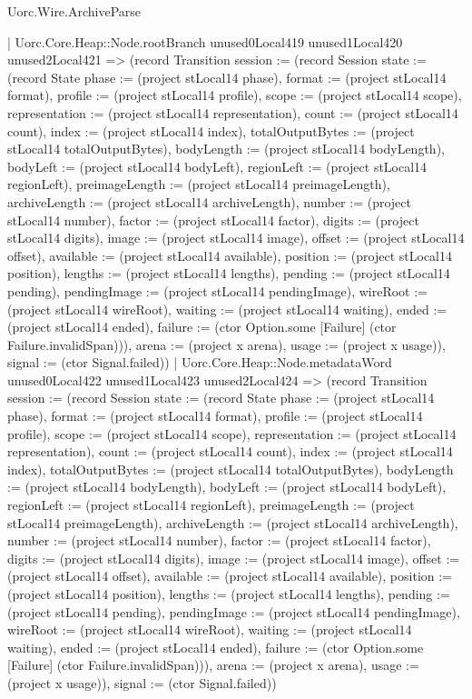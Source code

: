 \begin{lexlean}{Uorc.Wire.ArchiveParse}
\begin{semanticmodule}
{            | Uorc.Core.Heap::Node.rootBranch unused0Local419 unused1Local420 unused2Local421 => (record Transition {session := (record Session {state := (record State {phase := (project stLocal14 phase), format := (project stLocal14 format), profile := (project stLocal14 profile), scope := (project stLocal14 scope), representation := (project stLocal14 representation), count := (project stLocal14 count), index := (project stLocal14 index), totalOutputBytes := (project stLocal14 totalOutputBytes), bodyLength := (project stLocal14 bodyLength), bodyLeft := (project stLocal14 bodyLeft), regionLeft := (project stLocal14 regionLeft), preimageLength := (project stLocal14 preimageLength), archiveLength := (project stLocal14 archiveLength), number := (project stLocal14 number), factor := (project stLocal14 factor), digits := (project stLocal14 digits), image := (project stLocal14 image), offset := (project stLocal14 offset), available := (project stLocal14 available), position := (project stLocal14 position), lengths := (project stLocal14 lengths), pending := (project stLocal14 pending), pendingImage := (project stLocal14 pendingImage), wireRoot := (project stLocal14 wireRoot), waiting := (project stLocal14 waiting), ended := (project stLocal14 ended), failure := (ctor Option.some [Failure] (ctor Failure.invalidSpan))}), arena := (project x arena), usage := (project x usage)}), signal := (ctor Signal.failed)})
            | Uorc.Core.Heap::Node.metadataWord unused0Local422 unused1Local423 unused2Local424 => (record Transition {session := (record Session {state := (record State {phase := (project stLocal14 phase), format := (project stLocal14 format), profile := (project stLocal14 profile), scope := (project stLocal14 scope), representation := (project stLocal14 representation), count := (project stLocal14 count), index := (project stLocal14 index), totalOutputBytes := (project stLocal14 totalOutputBytes), bodyLength := (project stLocal14 bodyLength), bodyLeft := (project stLocal14 bodyLeft), regionLeft := (project stLocal14 regionLeft), preimageLength := (project stLocal14 preimageLength), archiveLength := (project stLocal14 archiveLength), number := (project stLocal14 number), factor := (project stLocal14 factor), digits := (project stLocal14 digits), image := (project stLocal14 image), offset := (project stLocal14 offset), available := (project stLocal14 available), position := (project stLocal14 position), lengths := (project stLocal14 lengths), pending := (project stLocal14 pending), pendingImage := (project stLocal14 pendingImage), wireRoot := (project stLocal14 wireRoot), waiting := (project stLocal14 waiting), ended := (project stLocal14 ended), failure := (ctor Option.some [Failure] (ctor Failure.invalidSpan))}), arena := (project x arena), usage := (project x usage)}), signal := (ctor Signal.failed)})
}
\end{semanticmodule}
\end{lexlean}

